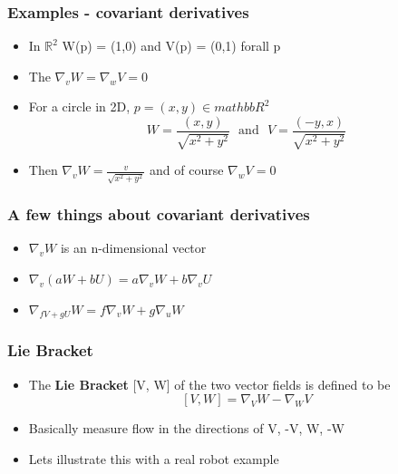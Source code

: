 \documentclass[10pt]{beamer}
\newcommand{\myemph}[1]{{\usebeamercolor[fg]{emphprimary}
    \textbf{#1}}}
\begin{document}
\begin{frame}
  \frametitle{Examples - covariant derivatives}
  \begin{itemize}
  \item In $\mathbb{R}^2$ W(p) = (1,0) and V(p) = (0,1) forall p
  \item The $\nabla_v W = \nabla_w V = 0$ 
  \item For a circle in 2D, $p = (x, y) \in mathbb{R}^2$
    \[
      W = \frac{(x,y)}{\sqrt{x^2 + y^2}} \mbox{~ and ~}
      V = \frac{(-y, x)}{\sqrt{x^2+y^2}}
    \]
  \item Then $\nabla_v W = \frac{v}{\sqrt{x^2 + y^2}}$ and of course
    $\nabla_w V = 0$
  \end{itemize}
\end{frame}

\begin{frame}
  \frametitle{A few things about covariant derivatives}
  \begin{itemize}
  \item $\nabla_v W$ is an n-dimensional vector 
  \item $\nabla_v (a W + b U) = a \nabla_v W + b \nabla_v U$
  \item $\nabla_{fV+gU} W = f \nabla_v W + g \nabla_u W$
  \end{itemize}
\end{frame}

\begin{frame}
  \frametitle{Lie Bracket}
  \begin{itemize}
  \item The \myemph{Lie Bracket} [V, W] of the two vector fields is
    defined to be
    \[ [V, W] = \nabla_V W - \nabla_W V \]
  \item Basically measure flow in the directions of V, -V, W, -W
  \item Lets illustrate this with a real robot example 
  \end{itemize}
\end{frame}
\end{document}
